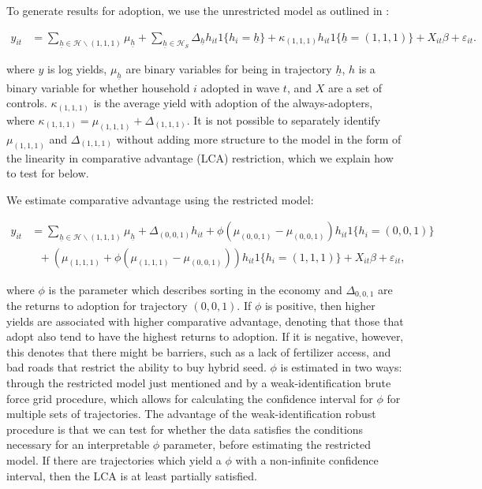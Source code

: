 \documentclass[11pt]{article}
\begin{document}
To generate results for adoption, we use the unrestricted model as outlined in \cite{Tjernstrom_Emilia_Dalia_Ghanem_Oscar_Barriga_Cabanillas_Travis_J_Lybbert_Jeffrey_D_Michler_and_Aleksandr_Michuda2020-bc}:

\begin{align}
y_{it}&=\sum_{\underline{h}\in\mathcal{H}\backslash (1,1,1)}\mu_{\underline{h}}+\sum_{\underline{h}\in\mathcal{H}_{S}}\Delta_{\underline{h}}h_{it}1\{h_{i}=\underline{h}\} + \kappa_{(1,1,1)}h_{it}1\{\underline{h}=(1,1,1)\}+ X_{it}\beta+\varepsilon_{it}.\label{eq:GRC}
\end{align}

where $y$ is log yields, $\mu_{\underline{h}}$ are binary variables for being in trajectory $\underline{h}$, $h$ is a binary variable for whether household $i$ adopted in wave $t$, and $X$ are a set of controls. $\kappa_{(1,1,1)}$ is the average yield with adoption of the always-adopters, where $\kappa_{(1,1,1)} = \mu_{(1,1,1)} + \Delta_{(1,1,1)}$. It is not possible to separately identify $\mu_{(1,1,1)}$ and $\Delta_{(1,1,1)}$ without adding more structure to the model in the form of the linearity in comparative advantage (LCA) restriction, which we explain how to test for below.

We estimate comparative advantage using the restricted model:

\begin{align}
y_{it}&=\sum_{\underline{h}\in\mathcal{H}\backslash (1,1,1)}\mu_{\underline{h}}+\Delta_{(0,0,1)}h_{it}+\phi(\mu_{(0,0,1)}-\mu_{(0,0,1)})h_{it}1\{h_{i}=(0,0,1)\}\nonumber\\
&~~~+\left(\mu_{(1,1,1)}+\phi\left(\mu_{(1,1,1)}-\mu_{(0,0,1)}\right)\right)h_{it}1\{h_{i}=(1,1,1)\} + X_{it}\beta +\varepsilon_{it},\label{eq:GRC_Suri}
\end{align}

where $\phi$ is the parameter which describes sorting in the economy and $\Delta_{0,0,1}$ are the returns to adoption for trajectory $(0,0,1)$. If $\phi$ is positive, then higher yields are associated with higher comparative advantage, denoting that those that adopt also tend to have the highest returns to adoption. If it is negative, however, this denotes that there might be barriers, such as a lack of fertilizer access, and bad roads that restrict the ability to buy hybrid seed. $\phi$ is estimated in two ways: through the restricted model just mentioned and by a weak-identification brute force grid procedure, which allows for calculating the confidence interval for $\phi$ for multiple sets of trajectories. The advantage of the weak-identification robust procedure is that we can test for whether the data satisfies the conditions necessary for an interpretable $\phi$ parameter, before estimating the restricted model. If there are trajectories which yield a $\phi$ with a non-infinite confidence interval, then the LCA is at least partially satisfied.
\end{document}
